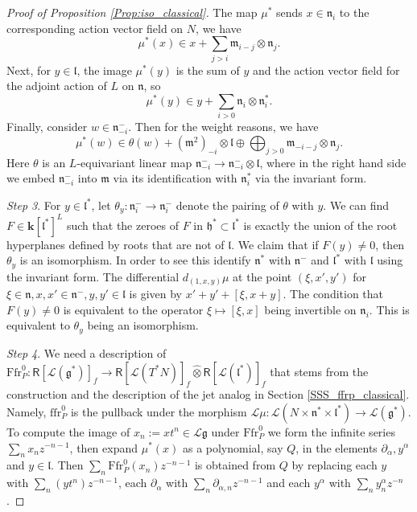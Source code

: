 \documentclass{amsart}
\theoremstyle{definition}
\newcommand{\Ring}{\mathsf{R}}
\newcommand{\g}{\mathfrak{g}}
\newcommand{\h}{\mathfrak{h}}
\newcommand{\ffr}{\mathrm{ffr}}
\newcommand{\lf}{\mathfrak{l}}
\newcommand{\Loop}{\mathscr{L}}
\newcommand{\bk}{\mathbf{k}}
\newcommand{\Ffr}{\mathrm{{Ffr}}}
\numberwithin{equation}{section}
\begin{document}
\begin{proof}[Proof of Proposition \ref{Prop:iso_classical}]
The map $\mu^*$ sends $x\in \mathfrak{n}_i$ to the corresponding action vector field on $N$, we have
\begin{equation}\label{eq:moment_n}
\mu^*(x)\in x+\sum_{j>i}\mathfrak{m}_{i-j}\otimes \mathfrak{n}_j.
\end{equation}
Next, for $y\in \mathfrak{l}$, the image $\mu^*(y)$ is the sum of $y$ and the action vector field for the adjoint action of $L$ on $\mathfrak{n}$, so
\begin{equation}\label{eq:moment_l}
\mu^*(y)\in y+\sum_{i>0}\mathfrak{n}_i\otimes \mathfrak{n}_i^*.
\end{equation}
Finally, consider $w\in \mathfrak{n}^-_{-i}$. Then for the weight reasons, we have 
\begin{equation}\label{eq:moment_n-}
\mu^*(w)\in \theta(w)+(\mathfrak{m}^2)_{-i}\otimes \lf
\oplus \bigoplus_{j>0}\mathfrak{m}_{-i-j}\otimes \mathfrak{n}_j.  
\end{equation}
Here $\theta$ is an $L$-equivariant linear map $\mathfrak{n}^-_{-i}\rightarrow \mathfrak{n}^-_{-i}\otimes \lf$, where in the right hand side we embed 
$\mathfrak{n}^-_{-i}$ into $\mathfrak{m}$ via its identification with $\mathfrak{n}_i^*$ via the invariant form.

{\it Step 3}. For $y\in \lf^*$, let $\theta_y:\mathfrak{n}^-_i
\rightarrow \mathfrak{n}^-_i$ denote the pairing of $\theta$ with $y$. 
We can find $F\in \bk[\lf^*]^L$ such that the zeroes of $F$ in $\h^*\subset \lf^*$ is exactly the union of the root hyperplanes defined by roots that are not of $\lf$. We claim that if $F(y)\neq 0$, then $\theta_y$ is an isomorphism. 
In order to see this
identify $\mathfrak{n}^*$ with $\mathfrak{n}^-$
and $\lf^*$ with $\lf$ using the invariant form.
The differential $d_{(1,x,y)}\mu$ at the point 
$(\xi,x',y')$ for $\xi\in \mathfrak{n}, x,x'\in \mathfrak{n}^-, 
y,y'\in \lf$ is given by $x'+y'+[\xi,x+y]$. The condition that $F(y)\neq 0$ is equivalent to the operator $\xi\mapsto [\xi,x]$ being invertible on 
$\mathfrak{n}_i$. This is equivalent to $\theta_y$ being an isomorphism. 

{\it Step 4}. We need a description of $\Ffr^0_P: \Ring[\Loop (\g^*)]_f\rightarrow \Ring[\Loop(T^*N)]_f\widehat{\otimes} \Ring[\Loop(\lf^*)]_f$ that stems from the construction and 
the description of the jet analog in Section \ref{SSS_ffrp_classical}.
Namely, $\ffr^0_P$ is the pullback under the morphism $\Loop \mu:
\Loop(N\times \mathfrak{n}^*\times \mathfrak{l}^*)\rightarrow \Loop(\g^*)$.
To compute the image of $x_n:=xt^n\in \Loop \g$ under $\Ffr^0_P$ we form 
the infinite series $\sum_{n}x_nz^{-n-1}$, then expand $\mu^*(x)$ as a polynomial, say $Q$, in the elements $\partial_\alpha, y^\alpha$ and $y\in \lf$. Then $\sum_{n}\Ffr_P^0(x_n)z^{-n-1}$ is obtained from $Q$ by replacing each $y$ with $\sum_n (yt^n)z^{-n-1}$, each $\partial_{\alpha}$ with $\sum_{n}\partial_{\alpha,n}z^{-n-1}$ and each $y^\alpha$ with 
$\sum_{n}y_n^\alpha z^{-n}$. 


\end{proof}
\end{document}
